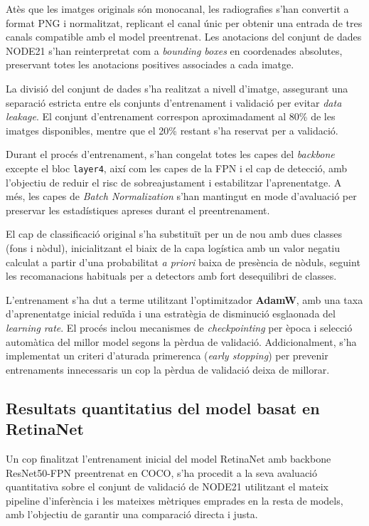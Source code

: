 \documentclass[conference]{IEEEtran}
\begin{document}
Atès que les imatges originals són monocanal, les radiografies s’han convertit a format PNG i normalitzat, replicant el canal únic per obtenir una entrada de tres canals compatible amb el model preentrenat. Les anotacions del conjunt de dades NODE21 s’han reinterpretat com a \textit{bounding boxes} en coordenades absolutes, preservant totes les anotacions positives associades a cada imatge.

La divisió del conjunt de dades s’ha realitzat a nivell d’imatge, assegurant una separació estricta entre els conjunts d’entrenament i validació per evitar \textit{data leakage}. El conjunt d’entrenament correspon aproximadament al 80\% de les imatges disponibles, mentre que el 20\% restant s’ha reservat per a validació.

Durant el procés d’entrenament, s’han congelat totes les capes del \textit{backbone} excepte el bloc \texttt{layer4}, així com les capes de la FPN i el cap de detecció, amb l’objectiu de reduir el risc de sobreajustament i estabilitzar l’aprenentatge. A més, les capes de \textit{Batch Normalization} s’han mantingut en mode d’avaluació per preservar les estadístiques apreses durant el preentrenament.

El cap de classificació original s’ha substituït per un de nou amb dues classes (fons i nòdul), inicialitzant el biaix de la capa logística amb un valor negatiu calculat a partir d’una probabilitat \textit{a priori} baixa de presència de nòduls, seguint les recomanacions habituals per a detectors amb fort desequilibri de classes.

L’entrenament s’ha dut a terme utilitzant l’optimitzador \textbf{AdamW}, amb una taxa d’aprenentatge inicial reduïda i una estratègia de disminució esglaonada del \textit{learning rate}. El procés inclou mecanismes de \textit{checkpointing} per època i selecció automàtica del millor model segons la pèrdua de validació. Addicionalment, s’ha implementat un criteri d’aturada primerenca (\textit{early stopping}) per prevenir entrenaments innecessaris un cop la pèrdua de validació deixa de millorar.




\subsection{Resultats quantitatius del model basat en RetinaNet}

Un cop finalitzat l’entrenament inicial del model RetinaNet amb backbone
ResNet50-FPN preentrenat en COCO, s’ha procedit a la seva avaluació quantitativa
sobre el conjunt de validació de NODE21 utilitzant el mateix pipeline
d’inferència i les mateixes mètriques emprades en la resta de models, amb
l’objectiu de garantir una comparació directa i justa.
\end{document}
